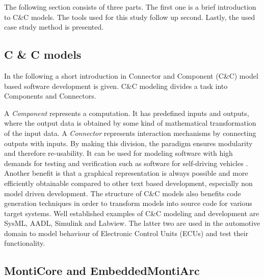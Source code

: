 The following section consists of three parts. The first one is a brief introduction to C\&C models. The tools used for this study follow up second. Lastly, the used case study method is presented.

\subsection{C \& C models}

In the following a short introduction in Connector and Component (C\&C) model based software development is given. C\&C modeling divides a task into Components and Connectors.

A \emph{Component} represents a computation. It has predefined inputs and outputs, where the output data is obtained by some kind of mathematical transformation of the input data. A \emph{Connector} represents interaction mechanisms by connecting outputs with inputs. By making this division, the paradigm ensures modularity and therefore re-usability.
It can be used for modeling software with high demands for testing and verification such as software for self-driving vehicles \cite{WencksternCCViP}\cite{WencksternSimFrame}.
Another benefit is that a graphical representation is always possible and more efficiently obtainable compared to other text based development, especially non model driven development. The structure of C\&C models also benefits code generation techniques in order to transform models into source code for various target systems.
Well established examples of C\&C modeling and development are SysML\cite{sysml}, AADL\cite{aadl}, Simulink\cite{simulink} and Labview\cite{labview}. The latter two are used in the automotive domain to model behaviour of Electronic Control Units (ECUs) and test their functionality.

\subsection{MontiCore and EmbeddedMontiArc}

